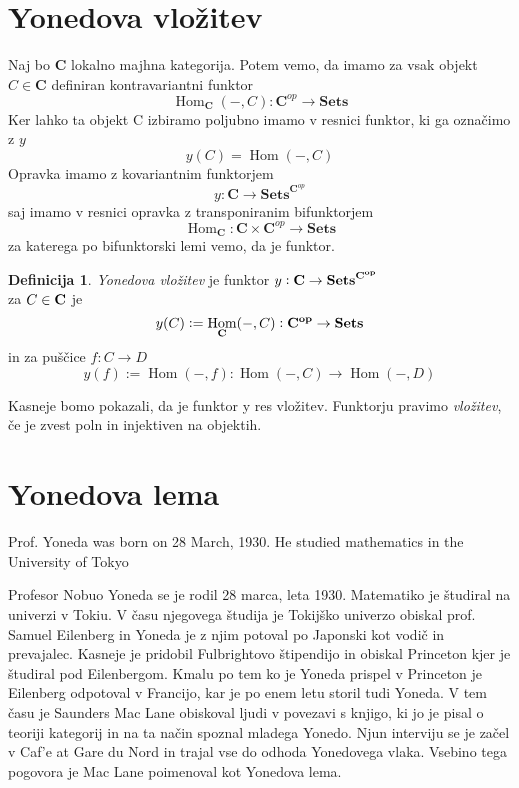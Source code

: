 \documentclass[12pt,a4paper]{book}
\theoremstyle{definition}
\newtheorem{definicija}{Definicija}[chapter]
\theoremstyle{plain}
\theoremstyle{definition}
\theoremstyle{remark}
\newcommand{\cat}[1]{\textbf{#1}}
\DeclareMathOperator{\Hom}{Hom}
\begin{document}
\section{Yonedova vložitev}

Naj bo $\mathbf{C}$ lokalno majhna kategorija.
Potem vemo, da imamo za vsak objekt $C \in \cat{C}$ definiran kontravariantni funktor 
$$\Hom_{\cat{C}}(-,C) : \cat{C}^{op} \to \cat{Sets}$$
Ker lahko ta objekt C izbiramo poljubno imamo v resnici funktor, ki ga označimo z $y$
$$y(C) = \Hom(-,C) $$
Opravka imamo z kovariantnim funktorjem 
$$y : \mathbf{C} \to \mathbf{Sets}^{\cat{C}^{op}}$$
saj imamo v resnici opravka z transponiranim bifunktorjem
$$\Hom_{\cat{C}} : \cat{C} \times \cat{C}^{op} \to \cat{Sets}$$
za katerega po bifunktorski lemi vemo, da je funktor.


\begin{definicija} {\it Yonedova vložitev} je funktor $y : \bf{C} \to \bf{Sets}^{\bf{C}^{op}}$ \\  za $C \in \bf{C}$ je $$y(C) := \Hom_{\bf{C}}(-, C) : \bf{C}^{op} \to \bf{Sets}$$ in za puščice $f : C \to D$
$$y(f) := \Hom(-,f) : \Hom(-,C) \to \Hom(-,D)$$
\end{definicija}

Kasneje bomo pokazali, da je funktor y res vložitev. Funktorju pravimo {\it vložitev}, če je zvest poln in injektiven na objektih.

\section{Yonedova lema}

Prof. Yoneda was born on 28 March, 1930.  He studied mathematics in
the University of Tokyo

Profesor Nobuo Yoneda se je rodil 28 marca, leta 1930. Matematiko je študiral na univerzi v Tokiu. V času njegovega študija je Tokijško univerzo obiskal prof. Samuel Eilenberg in Yoneda je z njim potoval po Japonski kot vodič in prevajalec. Kasneje je pridobil Fulbrightovo štipendijo in obiskal Princeton kjer je študiral pod Eilenbergom. Kmalu po tem ko je Yoneda prispel v Princeton je Eilenberg odpotoval v Francijo, kar je po enem letu storil tudi Yoneda. V tem času je Saunders Mac Lane obiskoval ljudi v povezavi s knjigo, ki jo je pisal o teoriji kategorij in na ta način spoznal mladega Yonedo. Njun interviju se je začel v Caf'e at Gare du Nord in trajal vse do odhoda Yonedovega vlaka. Vsebino tega pogovora je Mac Lane poimenoval kot Yonedova lema.
\end{document}
